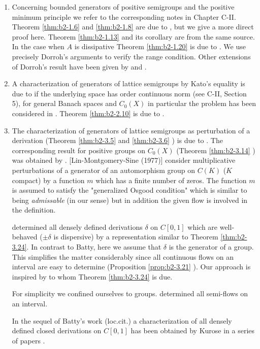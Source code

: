 \begin{enumerate}[label=\emph{Section \arabic*:}, wide]

\item
Concerning bounded generators of positive semigroups and the positive minimum principle we refer to the corresponding notes in Chapter C-II.
Theorem \ref{thm:b2-1.6} and \ref{thm:b2-1.8} are due to \citet{arendtchernoffkato:1982}, but we give a more direct proof here.
Theorem \ref{thm:b2-1.13} and its corollary are from the same source.
In the case when $A$ is dissipative Theorem \ref{thm:b2-1.20} is due to \citet{dorroh:1966}.
We use precisely Dorroh's arguments to verify the range condition.
Other extensions of Dorroh's result have been given by \citet{lumer:1974} and \citet{lumer:1975}.

\item 
A characterization of generators of lattice semigroups by Kato's equality is due to  \citet{nageluhlig:1981} if the underlying space has order continuous norm (see C-II, Section 5), for general Banach spaces and $C_{0}(X)$ in particular the problem has been considered in \citet{arendt:1982}.
Theorem \ref{thm:b2-2.10} is due to \citet{uhlig:1979}.

\item
The characterization of generators of lattice semigroups as perturbation of a derivation (Theorem \ref{thm:b2-3.5} and \ref{thm:b2-3.6} ) is due to \citet{derndingernagel:1979}.
The corresponding result for positive groups on $C_{0}(X)$ (Theorem \ref{thm:b2-3.14} ) was obtained by \citet{arendtgreiner:1984}.
\citet{linetal:1977} [Lin-Montgomery-Sine (1977)] 
consider multiplicative perturbations of a generator of an automorphism group on $C(K)$ ($K$ compact) by a function $m$ which has a finite number of zeros.
The function $m$ is assumed to satisfy the "generalized Osgood condition" which is similar to being \emph{admissable} (in our sense) but in addition the given flow is involved in the definition.

\citet{batty:1981} determined all densely defined derivations $\delta$ on $C[0,1]$ which are well-behaved (\ie  $\pm\delta$ is dispersive) by a representation similar to Theorem \ref{thm:b2-3.24}.
In contrast to Batty, here we assume that $\delta$ is the generator of a group.
This simplifies the matter considerably since all continuous flows on an interval are easy to determine (Proposition \ref{prop:b2-3.21} ).
Our approach is inspired by \citet{delaubenfels:1984} to whom Theorem \ref{thm:b2-3.24} is due.

For simplicity we confined ourselves to groups.
\citet{uhlig:1979} determined all semi-flows on an interval.

In the sequel of Batty's work (loc.cit.) a characterization of all densely defined closed derivations on $C[0,1]$ has been obtained by Kurose in a series of papers 
\citet{kurose:1981, kurose:1982, kurose:1983}.
\end{enumerate}

\begin{comment}
\section*{References}
\addcontentsline{toc}{section}{References}
{\RaggedRight
\renewcommand{\bibsection}{}

}
\end{comment}
